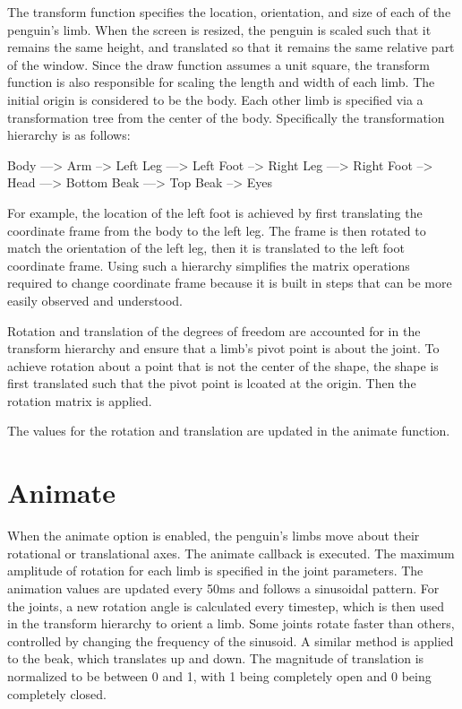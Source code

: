 \documentclass{scrartcl}
\begin{document}
The transform function specifies the location, orientation, and size of each of the penguin's limb. When the screen is resized, the penguin is scaled such that it remains the same height, and translated so that it remains the same relative part of the window. Since the draw function assumes a unit square, the transform function is also responsible for scaling the length and width of each limb. The initial origin is considered to be the body. Each other limb is specified via a transformation tree from the center of the body. Specifically the transformation hierarchy is as follows:

Body ---> Arm
	\---> Left Leg ---> Left Foot
	\---> Right Leg ---> Right Foot
	\---> Head ---> Bottom Beak ---> Top Beak
		\---> Eyes

For example, the location of the left foot is achieved by first translating the coordinate frame from the body to the left leg. The frame is then rotated to match the orientation of the left leg, then it is translated to the left foot coordinate frame. Using such a hierarchy simplifies the matrix operations required to change coordinate frame because it is built in steps that can be more easily observed and understood.

Rotation and translation of the degrees of freedom are accounted for in the transform hierarchy and ensure that a limb's pivot point is about the joint. To achieve rotation about a point that is not the center of the shape, the shape is first translated such that the pivot point is lcoated at the origin. Then the rotation matrix is applied.

The values for the rotation and translation are updated in the animate function.		

\section{Animate}


When the animate option is enabled, the penguin's limbs move about their rotational or translational axes. The animate callback is executed. The maximum amplitude of rotation for each limb is specified in the joint parameters. The animation values are updated every 50ms and follows a sinusoidal pattern. For the joints, a new rotation angle is calculated every timestep, which is then used in the transform hierarchy to orient a limb. Some joints rotate faster than others, controlled by changing the frequency of the sinusoid. A similar method is applied to the beak, which translates up and down. The magnitude of translation is normalized to be between 0 and 1, with 1 being completely open and 0 being completely closed.
\end{document}
